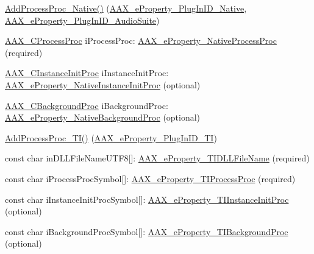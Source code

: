 \mbox{\hyperlink{a01901_a21e758a4ad757e694c183548fe58f0f0}{Add\+Process\+Proc\+\_\+\+Native()}} (\mbox{\hyperlink{a00662_a13e384f22825afd3db6d68395b79ce0da89ca3dd6e96895cda14976c1b1ceb826}{A\+A\+X\+\_\+e\+Property\+\_\+\+Plug\+In\+I\+D\+\_\+\+Native}}, \mbox{\hyperlink{a00662_a13e384f22825afd3db6d68395b79ce0dad3344696b8298a8b254add3d039ea927}{A\+A\+X\+\_\+e\+Property\+\_\+\+Plug\+In\+I\+D\+\_\+\+Audio\+Suite}})
\begin{DoxyItemize}
\item \mbox{\hyperlink{a00401_ad6dd5e1aa5bd2f8462966685e3b26a6e}{A\+A\+X\+\_\+\+C\+Process\+Proc}} {\ttfamily i\+Process\+Proc\+:} \mbox{\hyperlink{a00662_a13e384f22825afd3db6d68395b79ce0da43e55994526d4623cab23fc3200d3762}{A\+A\+X\+\_\+e\+Property\+\_\+\+Native\+Process\+Proc}} (required)
\item \mbox{\hyperlink{a00401_a3963a850079d3186e08c97a1a4d0ef1c}{A\+A\+X\+\_\+\+C\+Instance\+Init\+Proc}} {\ttfamily i\+Instance\+Init\+Proc\+:} \mbox{\hyperlink{a00662_a13e384f22825afd3db6d68395b79ce0da0f182ea271ec0aa1a49dd9c995826ef5}{A\+A\+X\+\_\+e\+Property\+\_\+\+Native\+Instance\+Init\+Proc}} (optional)
\item \mbox{\hyperlink{a00401_aa64561d963284a3124a0821e7dc79c9a}{A\+A\+X\+\_\+\+C\+Background\+Proc}} {\ttfamily i\+Background\+Proc\+:} \mbox{\hyperlink{a00662_a13e384f22825afd3db6d68395b79ce0daee9d07e634f3f31988e0bbcfa33a6222}{A\+A\+X\+\_\+e\+Property\+\_\+\+Native\+Background\+Proc}} (optional)
\end{DoxyItemize}

\mbox{\hyperlink{a01901_ad9957b836cf89a8f82dbb7eab9953fc5}{Add\+Process\+Proc\+\_\+\+T\+I()}} (\mbox{\hyperlink{a00662_a13e384f22825afd3db6d68395b79ce0da75f174df4efbeca86eaada126c1d9214}{A\+A\+X\+\_\+e\+Property\+\_\+\+Plug\+In\+I\+D\+\_\+\+TI}})
\begin{DoxyItemize}
\item {\ttfamily const char in\+D\+L\+L\+File\+Name\+U\+T\+F8\mbox{[}\mbox{]}}\+: \mbox{\hyperlink{a00662_a13e384f22825afd3db6d68395b79ce0daa38d1dee38945c7b0f5333b6cec02819}{A\+A\+X\+\_\+e\+Property\+\_\+\+T\+I\+D\+L\+L\+File\+Name}} (required)
\item {\ttfamily const char i\+Process\+Proc\+Symbol\mbox{[}\mbox{]}}\+: \mbox{\hyperlink{a00662_a13e384f22825afd3db6d68395b79ce0da1c4750cff6cd0dc467287edfb88ed495}{A\+A\+X\+\_\+e\+Property\+\_\+\+T\+I\+Process\+Proc}} (required)
\item {\ttfamily const char i\+Instance\+Init\+Proc\+Symbol\mbox{[}\mbox{]}}\+: \mbox{\hyperlink{a00662_a13e384f22825afd3db6d68395b79ce0dace404ac7f105c8bca24cf14e26479265}{A\+A\+X\+\_\+e\+Property\+\_\+\+T\+I\+Instance\+Init\+Proc}} (optional)
\item {\ttfamily const char i\+Background\+Proc\+Symbol\mbox{[}\mbox{]}}\+: \mbox{\hyperlink{a00662_a13e384f22825afd3db6d68395b79ce0dafcf70d8ff9b7a5853ce6248b8deeaeef}{A\+A\+X\+\_\+e\+Property\+\_\+\+T\+I\+Background\+Proc}} (optional)
\end{DoxyItemize}

